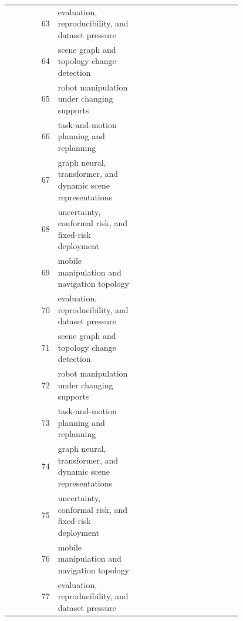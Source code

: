 \documentclass{article}
\begin{document}
\begin{longtable}{r p{0.34\linewidth} p{0.45\linewidth}}
63 & evaluation, reproducibility, and dataset pressure & \citep{do2024improved187,zeng2024hardnessaware188,tan2023vietnamese189} \\
64 & scene graph and topology change detection & \citep{peng2022openscene190,zhang2022languageassisted191,pandey2024textsleuth192} \\
65 & robot manipulation under changing supports & \citep{liao2023kitti360193,menon2022nbvsc194,lu2005weighted195} \\
66 & task-and-motion planning and replanning & \citep{wijayathunga2023challenges196,ling2022computer197,gupta2011from198} \\
67 & graph neural, transformer, and dynamic scene representations & \citep{zhang20253d199,s2024review200,liu2019outdoor201} \\
68 & uncertainty, conformal risk, and fixed-risk deployment & \citep{betgebrezetz2002natural202,peng2023openscene203,rosales2019expanding204} \\
69 & mobile manipulation and navigation topology & \citep{kulecki2024multimodal205,potnis2023towards206,li20233d207} \\
70 & evaluation, reproducibility, and dataset pressure & \citep{lee2024multirobot208,neuman2011segmentationbased209,jiang2024mdanet210} \\
71 & scene graph and topology change detection & \citep{nejatishahidin2022review211,ghaffarkhah2012path212,varava2021free213} \\
72 & robot manipulation under changing supports & \citep{wijayathungandchallenges214,singh2025urban215,geng2025remote216} \\
73 & task-and-motion planning and replanning & \citep{hong2020trajectory217,behley2021towards218,liu2024visionlanguage219} \\
74 & graph neural, transformer, and dynamic scene representations & \citep{karandikar2026camerabased220,cornelia2017ball221,lavado2025scenenet222} \\
75 & uncertainty, conformal risk, and fixed-risk deployment & \citep{zhang2025enhanced223,dai2024optimal224,amiri2022reasoning225} \\
76 & mobile manipulation and navigation topology & \citep{crooks2015walk226,yang2025swin3d227,wu2023design228} \\
77 & evaluation, reproducibility, and dataset pressure & \citep{zhang2025chameleon229,achirei2021short230} \\
\bottomrule
\end{longtable}
\endgroup



\end{document}
